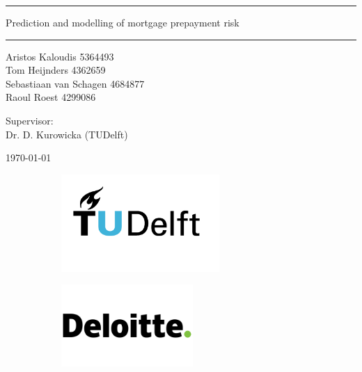 \documentclass[11pt,titlepage,a4paper]{article}
\begin{document}
    \begin{titlepage}
        \vspace{\fill}
        \centering
        \par\noindent\rule{\textwidth}{0.4pt}
        
        {
            \Huge Prediction and modelling of mortgage prepayment risk
        }
        
        \par\noindent\rule{\textwidth}{0.4pt}
        
        \vspace{3cm}

        {\large 
            Aristos Kaloudis 5364493 \\
            Tom Heijnders 4362659 \\
            Sebastiaan van Schagen 4684877 \\
            Raoul Roest 4299086
        }

        \vspace{1cm}

        {
            \large Supervisor:\\ 
            Dr. D. Kurowicka (TUDelft)
        }
        
        \vspace{1cm}

        \today

        \vspace{1cm}
        
        \begin{figure}[H]    
            \centering
            \begin{subfigure}{0.4\textwidth}
                \includegraphics[width=6cm]{Figures/TU_Delft_logo_RGB.png}
            \end{subfigure}
    
            \begin{subfigure}{0.4\textwidth}
                \includegraphics[width=5cm]{Figures/Logo_Deloitte.png}
            \end{subfigure}
        \end{figure}
    
        \vfill
    
    \end{titlepage}
\end{document}
